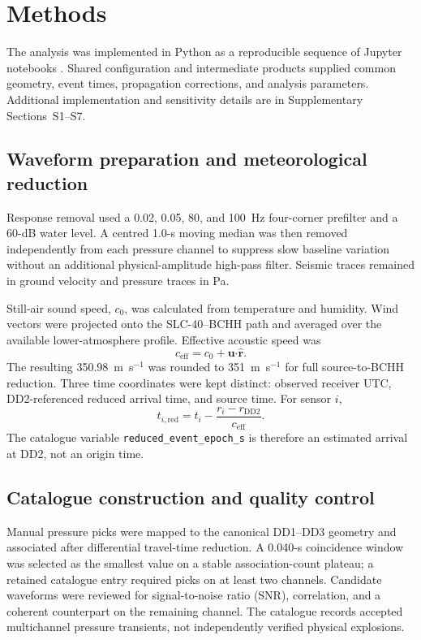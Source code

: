 \documentclass[]{seismica}
\begin{document}
\section{Methods}
\label{sec:methods}

The analysis was implemented in Python as a reproducible sequence of Jupyter
notebooks \citep{kluyver2016jupyter}. Shared configuration and intermediate
products supplied common geometry, event times, propagation corrections, and
analysis parameters. Additional implementation and sensitivity details are in
Supplementary Sections~S1--S7.

\subsection{Waveform preparation and meteorological reduction}

Response removal used a 0.02, 0.05, 80, and 100~Hz four-corner prefilter and a
60-dB water level. A centred 1.0-s moving median was then removed independently
from each pressure channel to suppress slow baseline variation without an
additional physical-amplitude high-pass filter. Seismic traces remained in
ground velocity and pressure traces in Pa.

Still-air sound speed, $c_0$, was calculated from temperature and humidity.
Wind vectors were projected onto the SLC-40--BCHH path and averaged over the
available lower-atmosphere profile. Effective acoustic speed was
\begin{equation}
 c_{\mathrm{eff}}=c_0+\mathbf{u}\boldsymbol{\cdot}\hat{\mathbf{r}}.
 \label{eq:effective_speed}
\end{equation}
The resulting 350.98~m~s$^{-1}$ was rounded to 351~m~s$^{-1}$ for full
source-to-BCHH reduction. Three time coordinates were kept distinct: observed
receiver UTC, DD2-referenced reduced arrival time, and source time. For sensor
$i$,
\begin{equation}
 t_{i,\mathrm{red}}=t_i-\frac{r_i-r_{\mathrm{DD2}}}{c_{\mathrm{eff}}}.
 \label{eq:reduced_time}
\end{equation}
The catalogue variable \texttt{reduced\_event\_epoch\_s} is therefore an
estimated arrival at DD2, not an origin time.

\subsection{Catalogue construction and quality control}

Manual pressure picks were mapped to the canonical DD1--DD3 geometry and
associated after differential travel-time reduction. A 0.040-s coincidence
window was selected as the smallest value on a stable association-count
plateau; a retained catalogue entry required picks on at least two channels.
Candidate waveforms were reviewed for signal-to-noise ratio (SNR), correlation,
and a coherent counterpart on the remaining channel. The catalogue records
accepted multichannel pressure transients, not independently verified physical
explosions.
\end{document}
